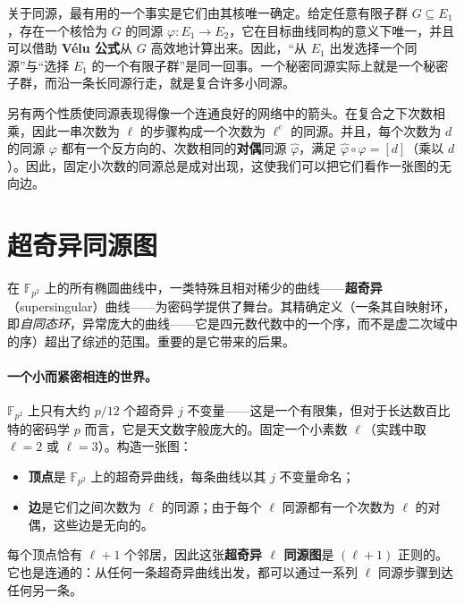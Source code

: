 关于同源，最有用的一个事实是它们由其核唯一确定。给定任意有限子群 $G \subseteq E_1$，存在一个核恰为 $G$ 的同源 $\varphi : E_1 \to E_2$，它在目标曲线同构的意义下唯一，并且可以借助 \textbf{V\'{e}lu 公式}从 $G$ 高效地计算出来。因此，“从 $E_1$ 出发选择一个同源”与“选择 $E_1$ 的一个有限子群”是同一回事。一个秘密同源实际上就是一个秘密子群，而沿一条长同源行走，就是复合许多小同源。

另有两个性质使同源表现得像一个连通良好的网络中的箭头。在复合之下次数相乘，因此一串次数为 $\ell$ 的步骤构成一个次数为 $\ell^e$ 的同源。并且，每个次数为 $d$ 的同源 $\varphi$ 都有一个反方向的、次数相同的\textbf{对偶}同源 $\hat{\varphi}$，满足 $\hat{\varphi} \circ \varphi = [d]$（乘以 $d$）。因此，固定小次数的同源总是成对出现，这使我们可以把它们看作一张图的无向边。

\section{超奇异同源图}

在 $\mathbb{F}_{p^2}$ 上的所有椭圆曲线中，一类特殊且相对稀少的曲线——\textbf{超奇异}（supersingular）曲线——为密码学提供了舞台。其精确定义（一条其自映射环，即\emph{自同态环}，异常庞大的曲线——它是四元数代数中的一个序，而不是虚二次域中的序）超出了综述的范围。重要的是它带来的后果。

\paragraph{一个小而紧密相连的世界。}
$\mathbb{F}_{p^2}$ 上只有大约 $p/12$ 个超奇异 $j$ 不变量——这是一个有限集，但对于长达数百比特的密码学 $p$ 而言，它是天文数字般庞大的。固定一个小素数 $\ell$（实践中取 $\ell = 2$ 或 $\ell = 3$）。构造一张图：
\begin{itemize}
  \item \textbf{顶点}是 $\mathbb{F}_{p^2}$ 上的超奇异曲线，每条曲线以其 $j$ 不变量命名；
  \item \textbf{边}是它们之间次数为 $\ell$ 的同源；由于每个 $\ell$ 同源都有一个次数为 $\ell$ 的对偶，这些边是无向的。
\end{itemize}
每个顶点恰有 $\ell + 1$ 个邻居，因此这张\textbf{超奇异 $\ell$ 同源图}是 $(\ell+1)$ 正则的。它也是连通的：从任何一条超奇异曲线出发，都可以通过一系列 $\ell$ 同源步骤到达任何另一条。

